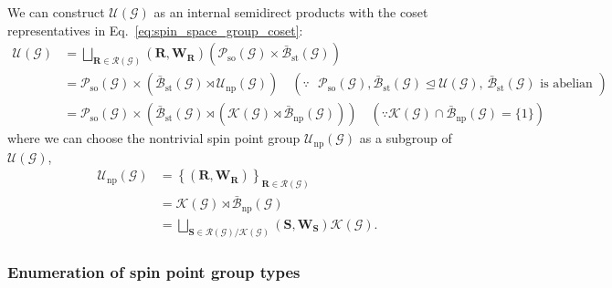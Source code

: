 We can construct $\mathcal{U}(\mathcal{G})$ as an internal semidirect products with the coset representatives in Eq.~\eqref{eq:spin_space_group_coset}:
\begin{align}
  \mathcal{U}(\mathcal{G})
    &= \bigsqcup_{ \bm{R} \in \mathcal{R}(\mathcal{G}) } (\bm{R}, \bm{W}_{\bm{R}}) \left( \mathcal{P}_{\mathrm{so}}(\mathcal{G}) \times \bar{\mathcal{B}}_{\mathrm{st}}(\mathcal{G}) \right) \nonumber \\
    &= \mathcal{P}_{\mathrm{so}}(\mathcal{G})
        \times \left(
          \bar{\mathcal{B}}_{\mathrm{st}}(\mathcal{G})
          \rtimes
          \mathcal{U}_{\mathrm{np}}(\mathcal{G})
         \right)
       \quad (\because \mbox{ $\mathcal{P}_{\mathrm{so}}(\mathcal{G}), \bar{\mathcal{B}}_{\mathrm{st}}(\mathcal{G}) \trianglelefteq \mathcal{U}(\mathcal{G})$, $\bar{\mathcal{B}}_{\mathrm{st}}(\mathcal{G})$ is abelian } ) \nonumber \\
    &= \mathcal{P}_{\mathrm{so}}(\mathcal{G})
        \times \left(
          \bar{\mathcal{B}}_{\mathrm{st}}(\mathcal{G})
          \rtimes
          \left(
            \mathcal{K}(\mathcal{G})
            \rtimes
            \bar{\mathcal{B}}_{\mathrm{np}}(\mathcal{G})
          \right)
         \right)
      \quad (\because \mathcal{K}(\mathcal{G}) \cap \bar{\mathcal{B}}_{\mathrm{np}}(\mathcal{G}) = \{ 1 \})
\end{align}
where we can choose the nontrivial spin point group $\mathcal{U}_{\mathrm{np}}(\mathcal{G})$ as a subgroup of $\mathcal{U}(\mathcal{G})$,
\begin{align}
  \mathcal{U}_{\mathrm{np}}(\mathcal{G})
    &= \left\{ (\bm{R}, \bm{W}_{\bm{R}}) \right\}_{ \bm{R} \in \mathcal{R}(\mathcal{G}) } \nonumber \\
    &= \mathcal{K}(\mathcal{G}) \rtimes \bar{\mathcal{B}}_{\mathrm{np}}(\mathcal{G}) \nonumber \\
    &= \bigsqcup_{ \bm{S} \in \mathcal{R}(\mathcal{G}) / \mathcal{K}(\mathcal{G}) } (\bm{S}, \bm{W}_{\bm{S}}) \mathcal{K}(\mathcal{G}).
\end{align}


\subsubsection{Enumeration of spin point group types}

